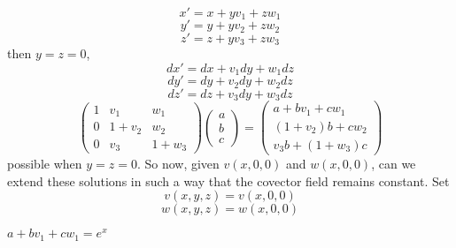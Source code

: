 \documentclass[dvipsnames,letterpaper,12pt]{article}
\begin{document}
%
\[ x' = x + y v_1 + z w_1 \]
\[ y' = y + y v_2 + z w_2 \]
\[ z' = z + y v_3 + z w_3 \]
%
then $y = z = 0$,
%
\[ dx' = dx + v_1 dy + w_1 dz \]
\[ dy' = dy + v_2 dy + w_2 dz \]
\[ dz' = dz + v_3 dy + w_3 dz \]
\[ \begin{pmatrix} 1 & v_1 & w_1 \\ 0 & 1 + v_2 & w_2 \\ 0 & v_3 & 1 + w_3 \end{pmatrix} \begin{pmatrix} a \\ b \\ c \end{pmatrix} = \begin{pmatrix} a + bv_1 + cw_1 \\ (1 + v_2) b + c w_2 \\ v_3 b + (1 + w_3) c \end{pmatrix} \]
%
possible when $y = z = 0$. So now, given $v(x,0,0)$ and $w(x,0,0)$, can we extend these solutions in such a way that the covector field remains constant. Set
%
\[ v(x,y,z) = v(x,0,0) \]
\[ w(x,y,z) = w(x,0,0) \]





$ a + b v_1 + cw_1 = e^x$

\end{document}
